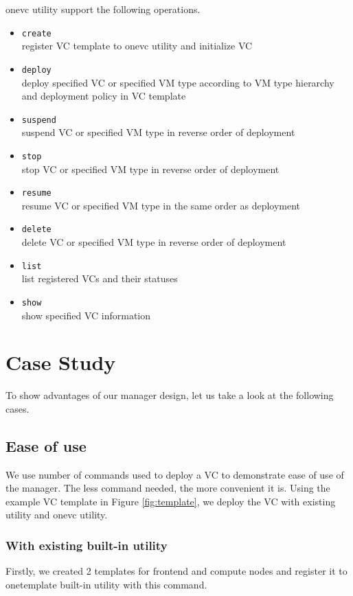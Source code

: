 \documentclass[conference]{IEEEtran}
\begin{document}
onevc utility support the following operations.

\begin{itemize}
\item \texttt{create}\\ register VC template to onevc utility and initialize VC
\item \texttt{deploy}\\ deploy specified VC or specified VM type according to VM type hierarchy and deployment policy in VC template 
\item \texttt{suspend}\\ suspend VC or specified VM type in reverse order of deployment
\item \texttt{stop}\\ stop VC or specified VM type in reverse order of deployment
\item \texttt{resume}\\ resume VC or specified VM type in the same order as deployment
\item \texttt{delete}\\ delete VC or specified VM type in reverse order of deployment
\item \texttt{list}\\ list registered VCs and their statuses
\item \texttt{show}\\ show specified VC information
\end{itemize}

\section{Case Study}
To show advantages of our manager design, let us take a look at the following cases.
 
\subsection{Ease of use}
We use number of commands used to deploy a VC to demonstrate ease of use of the manager.
The less command needed, the more convenient it is.
Using the example VC template in Figure \ref{fig:template}, we deploy the VC with existing utility and onevc utility.

\subsubsection{With existing built-in utility}
Firstly, we created 2 templates for frontend and compute nodes and register it to onetemplate built-in utility with this command.
\end{document}
